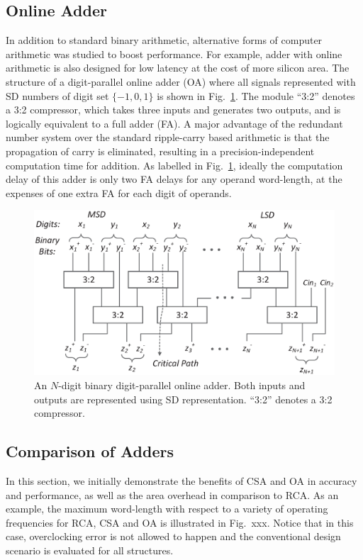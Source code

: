 \documentclass[10pt, conference, compsocconf]{IEEEtran}
\begin{document}
\subsection{Online Adder}\label{subsec:online_adder}
In addition to standard binary arithmetic, alternative forms of computer arithmetic was studied to boost performance. For example, adder with online arithmetic is also designed for low latency at the cost of more silicon area. The structure of a digit-parallel online adder (OA) where all signals represented with SD numbers of digit set $\{-1,0,1\}$ is shown in Fig.~\ref{Fig:Radix2SD_adder}. The module ``3:2'' denotes a 3:2 compressor, which takes three inputs and generates two outputs, and is logically equivalent to a full adder (FA). A major advantage of the redundant number system over the standard ripple-carry based arithmetic is that the propagation of carry is eliminated, resulting in a precision-independent computation time for addition. As labelled in Fig.~\ref{Fig:Radix2SD_adder}, ideally the computation delay of this adder is only two FA delays for any operand word-length, at the expenses of one extra FA for each digit of operands. 
%
\begin{figure}[tbp]
  \centering
  \includegraphics[width=.45\textwidth]{./figures/SDAdder.eps}
  \caption{An $N$-digit binary digit-parallel online adder. Both inputs and outputs are represented using SD representation. ``3:2'' denotes a 3:2 compressor.}
    \vspace{-2ex}
  \label{Fig:Radix2SD_adder}
\end{figure}

\subsection{Comparison of Adders}
In this section, we initially demonstrate the benefits of CSA and OA in accuracy and performance, as well as the area overhead in comparison to RCA. As an example, the maximum word-length with respect to a variety of operating frequencies for RCA, CSA and OA is illustrated in Fig.~xxx. Notice that in this case, overclocking error is not allowed to happen and the conventional design scenario is evaluated for all structures.
\end{document}
